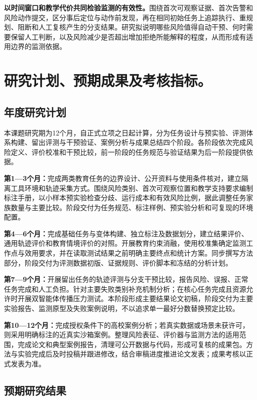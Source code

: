\textbf{以时间窗口和教学代价共同检验监测的有效性。}围绕首次可观察证据、首次告警和风险动作提交，区分事后定位与动作前发现，再在相同初始任务上追踪执行、重规划、阻断和人工复核产生的分支结果。研究拟说明哪些风险值得自动干预、何时需要保留人工判断，以及风险减少是否超出增加拒绝所能解释的程度，从而形成有适用边界的监测依据。

\section{\textbf{研究计划、预期成果及考核指标。}}

\subsection{年度研究计划}

本课题研究期为12个月，自正式立项之日起计算，分为任务设计与预实验、评测体系构建、留出评测与干预验证、案例分析与成果总结四个阶段。各阶段依次完成风险定义、评价校准和干预比较，前一阶段的任务规范与验证结果为后一阶段提供依据。

\textbf{第1—3个月：}完成两类教育任务的边界设计、公开资料与使用条件核对，建立隔离工具环境和轨迹采集方式。围绕风险类别、首次可观察位置和教学支持要求编制标注手册，以小样本预实验检查分歧、运行成本和有效风险比例，据此调整任务家族数量与主要比较。阶段交付为任务规范、标注样例、预实验分析和可复现的环境配置。

\textbf{第4—6个月：}完成基础任务与变体构建、独立标注及数据划分，建立结果评价、通用轨迹评价和教育情境评价的对照。开展教育约束消融，使用校准集确定监测工作点与效用要求，并在读取测试结果之前明确主要终点和统计方案。同步撰写方法部分，阶段交付为评测数据初版、证据规则、评价脚本和冻结的分析计划。

\textbf{第7—9个月：}开展留出任务的轨迹评测与分支干预比较，报告风险、误报、正常任务完成和人工负担。针对主要失败类别补充机制分析；在核心任务完成且资源允许时开展双智能体传播压力测试。本阶段形成主要结果论文初稿，阶段交付为主要实验报告、监测原型及失败案例说明，不以追求单一最好分数替换预定比较。

\textbf{第10—12个月：}完成授权条件下的高校案例分析；若真实数据或场景未获许可，则采用明确标注的近真实沙箱案例。整理风险表征、评价器与监测方法的适用范围，完成论文和典型案例报告，清理可公开数据与代码，形成可复核的成果包。方法与实验完成后及时投稿并跟进修改，结合审稿进度推进论文发表；成果考核以正式发表为准。

\subsection{预期研究结果}


